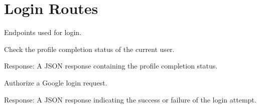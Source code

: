 \documentclass[letterpaper,10pt,english]{sphinxmanual}
\begin{document}
\sphinxstepscope


\chapter{Login Routes}
\label{\detokenize{routes.login:module-routes.login.routes}}\label{\detokenize{routes.login:login-routes}}\label{\detokenize{routes.login::doc}}
\sphinxAtStartPar
Endpoints used for login.

\begin{fulllineitems}
\label{\detokenize{routes.login:routes.login.routes.check_profile_status}}
\pysigstartsignatures
{}
\pysigstopsignatures
\sphinxAtStartPar
Check the profile completion status of the current user.
\begin{description}
\sphinxAtStartPar
Response: A JSON response containing the profile completion status.

\end{description}

\end{fulllineitems}


\begin{fulllineitems}
\label{\detokenize{routes.login:routes.login.routes.gauthorize}}
\pysigstartsignatures
{}
\pysigstopsignatures
\sphinxAtStartPar
Authorize a Google login request.
\begin{description}
\sphinxAtStartPar
Response: A JSON response indicating the success or failure of the login attempt.

\end{description}

\end{fulllineitems}

\end{document}
